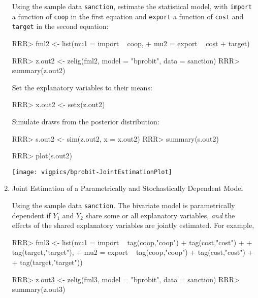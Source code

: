 \begin{enumerate}
Using the sample data \texttt{sanction}, estimate the statistical model, 
with {\tt import} a function of {\tt coop} in the first equation and 
{\tt export} a function of {\tt cost} and {\tt target} in the second equation:
\begin{Schunk}
\begin{Sinput}
RRR>  fml2 <- list(mu1 = import ~ coop, 
+                mu2 = export ~ cost + target)
\end{Sinput}
\end{Schunk}
\begin{Schunk}
\begin{Sinput}
RRR>  z.out2 <- zelig(fml2, model = "bprobit", data = sanction)
RRR>  summary(z.out2)
\end{Sinput}
\end{Schunk}
Set the explanatory variables to their means:
\begin{Schunk}
\begin{Sinput}
RRR>  x.out2 <- setx(z.out2)
\end{Sinput}
\end{Schunk}
Simulate draws from the posterior distribution:
\begin{Schunk}
\begin{Sinput}
RRR>  s.out2 <- sim(z.out2, x = x.out2)
RRR>  summary(s.out2)
\end{Sinput}
\end{Schunk}
\begin{center}
\begin{Schunk}
\begin{Sinput}
RRR>  plot(s.out2)
\end{Sinput}
\end{Schunk}
\texttt{[image: vigpics/bprobit-JointEstimationPlot]}
\end{center}


\item Joint Estimation of a Parametrically and Stochastically
Dependent Model 
\label{pdep.p}
  
Using the sample data \texttt{sanction}.     
The bivariate model is parametrically dependent if $Y_1$ and $Y_2$ share
some or all explanatory variables, {\it and} the effects of the shared
explanatory variables are jointly estimated.  For example,
\begin{Schunk}
\begin{Sinput}
RRR>  fml3 <- list(mu1 = import ~ tag(coop,"coop") + tag(cost,"cost") + 
+                           tag(target,"target"), 
+                mu2 = export ~ tag(coop,"coop") + tag(cost,"cost") + 
+                           tag(target,"target"))
\end{Sinput}
\end{Schunk}
\begin{Schunk}
\begin{Sinput}
RRR>  z.out3 <- zelig(fml3, model = "bprobit", data = sanction)
RRR>  summary(z.out3)
\end{Sinput}
\end{Schunk}


\end{enumerate}
